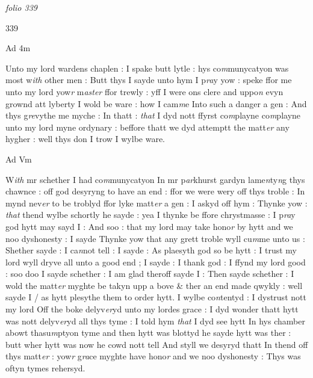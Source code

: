 \documentclass[12pt, a4paper]{book}
\begin{document}
\dotfill
						\newpage
{}

\textit{folio 339}


\begin{flushright}{\color{Mahogany}339}\end{flushright}
 	
		\ifthenelse{\isodd{\thepage}}
		{\reversemarginpar}
		{\normalmarginpar}
		Ad 4m

 		
		\ifthenelse{\isodd{\thepage}}
		{\reversemarginpar}
		{\normalmarginpar}
		Unto my lord wardens chaplen : I spake butt lytle : hys
co\textit{m}munycatyon was most w\textit{ith }other men : Butt thys I sayde
unto hym I p\textit{ra}y yow : speke ffor me unto my lord yow\textit{r} m\textit{aster}
ffor trewly : yff I were ons clere and uppo\textit{n} evyn grownd att
lyberty I wold be ware : how I cam\textit{m}e Into such a danger
a gen : And thys g\textit{re}vythe me myche : In thatt : \textit{that} I dyd nott 
ffyrst co\textit{m}playne co\textit{m}playne unto my lord myne ordynary : beffore
thatt we dyd attemptt the matt\textit{er} any hygher : well thys don
I trow I wylbe ware.
 	
 	
		\ifthenelse{\isodd{\thepage}}
		{\reversemarginpar}
		{\normalmarginpar}
		Ad Vm

 		
		\ifthenelse{\isodd{\thepage}}
		{\reversemarginpar}
		{\normalmarginpar}
		W\textit{ith} mr schether I had co\textit{m}munycatyon In mr p\textit{ar}khurst gardyn lame\textit{n}ty\textit{n}g
thys chawnce : off god desyryng to have an end : ffor we were
wery off thys troble : In mynd nev\textit{er} to be troblyd ffor lyke matt\textit{er}
a gen : I askyd off hym : Thynke yow : \textit{that} thend wylbe schortly 
he sayde : yea I thynke be ffore chrystmasse : I p\textit{ra}y god hytt
may sayd I : And soo : that my lord may take hono\textit{r} by hytt
and we noo dyshonesty : I sayde Thynke yow that any grett
troble wyll cu\textit{m}me unto us : Shether sayde : I ca\textit{n}not tell : I
sayde : As plaesyth god so be hytt : I trust my lord wyll dryve 
all unto a good end ; I sayde : I thank god : I ffynd my lord
good : soo doo I sayde schether : I am glad theroff sayde I : Then 
sayde schether : I wold the matt\textit{er} myghte be takyn upp a bove
\& ther an end made qwykly : well sayde I / as hytt plesythe
them to order hytt. I wylbe co\textit{n}tentyd : I dystrust nott my lord
Off the boke delyv\textit{er}yd unto my lordes grace  : I dyd wonder thatt hytt 
was nott delyv\textit{er}yd all thys tyme : I told hym \textit{that} I dyd see hytt
In hys chamber abowt thasu\textit{m}ptyon tyme and then hytt was blottyd
he sayde hytt was ther : butt wher hytt was now he cowd nott tell
And styll we desyryd thatt In thend off thys matt\textit{er} : yow\textit{r} g\textit{ra}ce myghte have
hono\textit{r} and we noo dyshonesty : Thys was oftyn tymes rehersyd.
\end{document}
